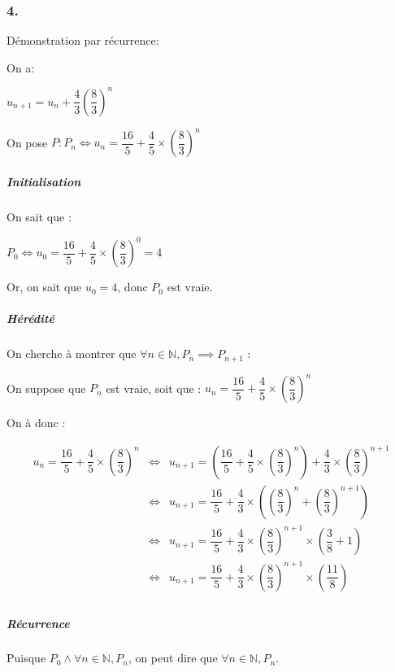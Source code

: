 \documentclass[]{scrartcl}
\let\oldsubparagraph\subparagraph
\renewcommand{\subparagraph}[1]{\oldsubparagraph{#1}\mbox{}}
\begin{document}
\hypertarget{section-5}{%
\subsubsection{4.}\label{section-5}}

Démonstration par récurrence:

On a:

\(u_{n+1} = u_n+\dfrac{4}{3} \left(\dfrac{8}{3}\right)^n\)

On pose
\(P: P_n \iff u_n = \dfrac{16}{5} + \dfrac{4}{5}\times \left(\dfrac{8}{3}\right)^{n}\)

\hypertarget{initialisation-1}{%
\subparagraph{Initialisation}\label{initialisation-1}}

On sait que :

\(P_0 \iff u_0 = \dfrac{16}{5} + \dfrac{4}{5}\times \left(\dfrac{8}{3}\right)^0 = 4\)

Or, on sait que \(u_0 = 4\), donc \(P_0\) est vraie.

\hypertarget{huxe9ruxe9dituxe9-1}{%
\subparagraph{Hérédité}\label{huxe9ruxe9dituxe9-1}}

On cherche à montrer que
\(\forall n\in\mathbb{N}, P_n \implies P_{n+1}\) :

On suppose que \(P_n\) est vraie, soit que :
\(u_n = \dfrac{16}{5} + \dfrac{4}{5}\times \left(\dfrac{8}{3}\right)^{n}\)

On à donc :

\[
\begin{array}{rcl}
    u_n = \dfrac{16}{5} + \dfrac{4}{5}\times \left(\dfrac{8}{3}\right)^{n} &\iff& u_{n+1} = \left(\dfrac{16}{5} + \dfrac{4}{5}\times \left(\dfrac{8}{3}\right)^{n}\right) + \dfrac{4}{3}\times \left(\dfrac{8}{3}\right)^{n+1}\\
        &\iff& u_{n+1} = \dfrac{16}{5} + \dfrac{4}{3}\times \left(\left(\dfrac{8}{3}\right)^{n} + \left(\dfrac{8}{3}\right)^{n+1}\right)\\
        &\iff& u_{n+1} = \dfrac{16}{5} + \dfrac{4}{3}\times \left(\dfrac{8}{3}\right)^{n+1} \times\left(\dfrac{3}{8} + 1\right)\\
        &\iff& u_{n+1} = \dfrac{16}{5} + \dfrac{4}{3}\times \left(\dfrac{8}{3}\right)^{n+1} \times\left(\dfrac{11}{8}\right)\\
\end{array}
\]

\hypertarget{ruxe9currence-1}{%
\subparagraph{Récurrence}\label{ruxe9currence-1}}

Puisque \(P_0 \wedge \forall n\in\mathbb{N}, P_n\), on peut dire que
\(\forall n\in\mathbb{N}, P_n\).
\end{document}
